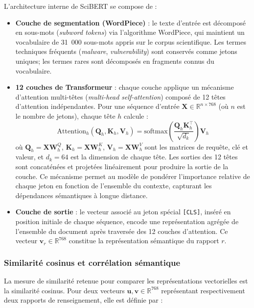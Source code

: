 L'architecture interne de SciBERT se compose de :
\begin{itemize}
    \item \textbf{Couche de segmentation (WordPiece)} : le texte d'entrée est décomposé en sous-mots (\textit{subword tokens}) via l'algorithme WordPiece, qui maintient un vocabulaire de 31~000 sous-mots appris sur le corpus scientifique. Les termes techniques fréquents (\textit{malware}, \textit{vulnerability}) sont conservés comme jetons uniques; les termes rares sont décomposés en fragments connus du vocabulaire.
    \item \textbf{12 couches de Transformeur} : chaque couche applique un mécanisme d'attention multi-têtes (\textit{multi-head self-attention}) composé de 12 têtes d'attention indépendantes. Pour une séquence d'entrée $\mathbf{X} \in \mathbb{R}^{n \times 768}$ (où $n$ est le nombre de jetons), chaque tête $h$ calcule :
    \[
    \text{Attention}_h(\mathbf{Q}_h, \mathbf{K}_h, \mathbf{V}_h) = \text{softmax}\!\left(\frac{\mathbf{Q}_h \mathbf{K}_h^\top}{\sqrt{d_k}}\right) \mathbf{V}_h
    \]
    où $\mathbf{Q}_h = \mathbf{X}\mathbf{W}_h^Q$, $\mathbf{K}_h = \mathbf{X}\mathbf{W}_h^K$, $\mathbf{V}_h = \mathbf{X}\mathbf{W}_h^V$ sont les matrices de requête, clé et valeur, et $d_k = 64$ est la dimension de chaque tête. Les sorties des 12 têtes sont concaténées et projetées linéairement pour produire la sortie de la couche. Ce mécanisme permet au modèle de pondérer l'importance relative de chaque jeton en fonction de l'ensemble du contexte, capturant les dépendances sémantiques à longue distance.
    \item \textbf{Couche de sortie} : le vecteur associé au jeton spécial \texttt{[CLS]}, inséré en position initiale de chaque séquence, encode une représentation agrégée de l'ensemble du document après traversée des 12 couches d'attention. Ce vecteur $\mathbf{v}_r \in \mathbb{R}^{768}$ constitue la représentation sémantique du rapport $r$.
\end{itemize}

\subsubsection{Similarité cosinus et corrélation sémantique}

La mesure de similarité retenue pour comparer les représentations vectorielles est la similarité cosinus. Pour deux vecteurs $\mathbf{u}, \mathbf{v} \in \mathbb{R}^{768}$ représentant respectivement deux rapports de renseignement, elle est définie par :

